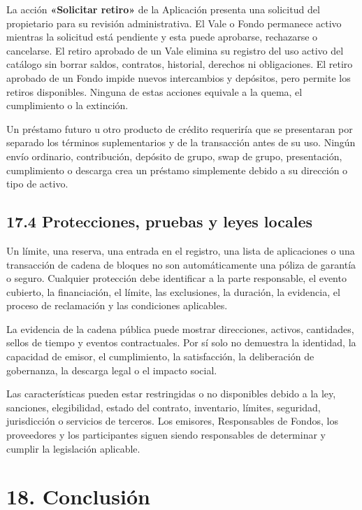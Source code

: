 \documentclass[11pt]{article}
\begin{document}
La acción \textbf{«Solicitar retiro»} de la Aplicación presenta una solicitud del propietario para su revisión administrativa. El Vale o Fondo permanece activo mientras la solicitud está pendiente y esta puede aprobarse, rechazarse o cancelarse. El retiro aprobado de un Vale elimina su registro del uso activo del catálogo sin borrar saldos, contratos, historial, derechos ni obligaciones. El retiro aprobado de un Fondo impide nuevos intercambios y depósitos, pero permite los retiros disponibles. Ninguna de estas acciones equivale a la quema, el cumplimiento o la extinción.

Un préstamo futuro u otro producto de crédito requeriría que se presentaran por separado los términos suplementarios y de la transacción antes de su uso. Ningún envío ordinario, contribución, depósito de grupo, swap de grupo, presentación, cumplimiento o descarga crea un préstamo simplemente debido a su dirección o tipo de activo.

\subsection*{17.4 Protecciones, pruebas y leyes locales}

Un límite, una reserva, una entrada en el registro, una lista de aplicaciones o una transacción de cadena de bloques no son automáticamente una póliza de garantía o seguro. Cualquier protección debe identificar a la parte responsable, el evento cubierto, la financiación, el límite, las exclusiones, la duración, la evidencia, el proceso de reclamación y las condiciones aplicables.

La evidencia de la cadena pública puede mostrar direcciones, activos, cantidades, sellos de tiempo y eventos contractuales. Por sí solo no demuestra la identidad, la capacidad de emisor, el cumplimiento, la satisfacción, la deliberación de gobernanza, la descarga legal o el impacto social.

Las características pueden estar restringidas o no disponibles debido a la ley, sanciones, elegibilidad, estado del contrato, inventario, límites, seguridad, jurisdicción o servicios de terceros. Los emisores, Responsables de Fondos, los proveedores y los participantes siguen siendo responsables de determinar y cumplir la legislación aplicable.


\section*{18. Conclusión}
\end{document}
